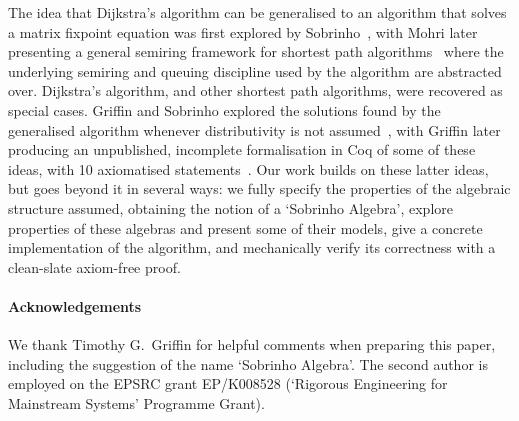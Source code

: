 The idea that Dijkstra's algorithm can be generalised to an algorithm that solves a matrix fixpoint equation was first explored by Sobrinho~\cite{sobrinho_algebra_2001}, with Mohri later presenting a general semiring framework for shortest path algorithms~\cite{mohri:semiring:2002} where the underlying semiring and queuing discipline used by the algorithm are abstracted over.
Dijkstra's algorithm, and other shortest path algorithms, were recovered as special cases.
Griffin and Sobrinho explored the solutions found by the generalised algorithm whenever distributivity is not assumed~\cite{sobrinho_routing_2010}, with Griffin later producing an unpublished, incomplete formalisation in Coq of some of these ideas, with 10 axiomatised statements~\cite{griffin:equilibrium-coq}.
Our work builds on these latter ideas, but goes beyond it in several ways: we fully specify the properties of the algebraic structure assumed, obtaining the notion of a `Sobrinho Algebra', explore properties of these algebras and present some of their models, give a concrete implementation of the algorithm, and mechanically verify its correctness with a clean-slate axiom-free proof.

\paragraph{Acknowledgements} We thank Timothy G.~Griffin for helpful comments when preparing this paper, including the suggestion of the name `Sobrinho Algebra'.
The second author is employed on the EPSRC grant EP/K008528 (`Rigorous Engineering for Mainstream Systems' Programme Grant).
